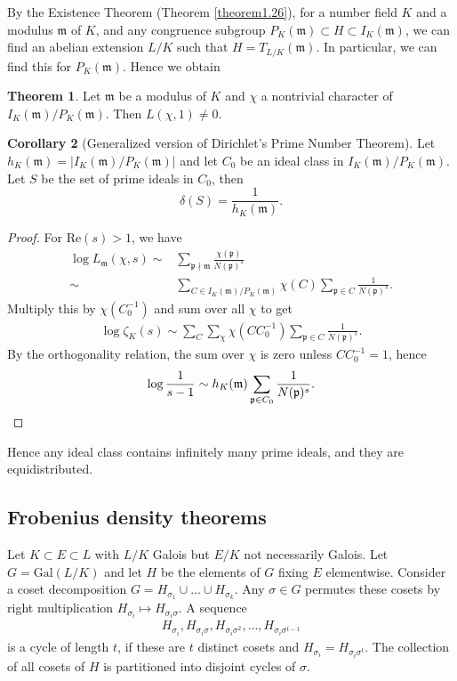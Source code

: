 \documentclass{article}
\theoremstyle{definition}
\newtheorem{theorem}{Theorem}[section]
\newtheorem{cor}[theorem]{Corollary}
\begin{document}
By the Existence Theorem (Theorem \ref{theorem1.26}), for a number field $K$ and a modulus $\mathfrak{m}$ of $K$, and any congruence subgroup $P_K(\mathfrak{m}) \subset H \subset I_K(\mathfrak{m})$, we can find an abelian extension $L/K$ such that $H = T_{L/K}(\mathfrak{m})$. In particular, we can find this for $P_K(\mathfrak{m})$. Hence we obtain
\begin{theorem}\label{theorem3.6}
    Let $\mathfrak{m}$ be a modulus of $K$ and $\chi$ a nontrivial character of $I_K(\mathfrak{m})/P_K(\mathfrak{m})$. Then $L(\chi,1) \neq 0$.
\end{theorem}
\begin{cor}[Generalized version of Dirichlet's Prime Number Theorem]\label{cor3.7}
    Let $h_K(\mathfrak{m}) = \left|I_K(\mathfrak{m})/P_K(\mathfrak{m})\right|$ and let $C_0$ be an ideal class in $I_K(\mathfrak{m})/P_K(\mathfrak{m})$. Let $S$ be the set of prime ideals in $C_0$, then \[
    \delta(S) = \frac{1}{h_K(\mathfrak{m})}.
    \]
\end{cor}
\begin{proof}
    For $\text{Re}(s)>1$, we have
    \begin{align*}
        \log L_{\mathfrak{m}}(\chi,s) \sim& \sum_{\mathfrak{p} \nmid \mathfrak{m}}^{} \frac{\chi(\mathfrak{p})}{N(\mathfrak{p})^s} \\
        \sim& \sum_{C \in I_K(\mathfrak{m})/P_K(\mathfrak{m})}^{} \chi(C) \sum_{\mathfrak{p}\in C}^{} \frac{1}{N(\mathfrak{p})^s}.
    \end{align*}
    Multiply this by $\chi(C_0^{-1})$ and sum over all $\chi$ to get
    \begin{align*}
        \log \zeta_K(s) \sim \sum_{C}^{} \sum_{\chi}^{} \chi(C C_0^{-1}) \sum_{\mathfrak{p} \in C}^{} \frac{1}{N(\mathfrak{p})^s}.
    \end{align*}
    By the orthogonality relation, the sum over $\chi$ is zero unless $C C_0^{-1} = 1$, hence 
    \begin{align*}
        \log \frac{1}{s-1} \sim h_K(\mathfrak{m}) \sum_{\mathfrak{p} \in C_0}^{} \frac{1}{N(\mathfrak{p})^s}.
        \qedhere
    \end{align*}
\end{proof}
Hence any ideal class contains infinitely many prime ideals, and they are equidistributed.

\subsection{Frobenius density theorems}
Let $K \subset E \subset L$ with $L/K$ Galois but $E/K$ not necessarily Galois. Let $G = \text{Gal}(L/K)$ and let $H$ be the elements of $G$ fixing $E$ elementwise. Consider a coset decomposition $G = H_{\sigma_1} \cup \ldots \cup H_{\sigma_k}$. Any $\sigma \in G$ permutes these cosets by right multiplication $H_{\sigma_i} \mapsto H_{\sigma_i \sigma}$. A sequence 
\begin{align*}
    H_{\sigma_i}, H_{\sigma_i \sigma}, H_{\sigma_i \sigma^2}, \ldots, H_{\sigma_i \sigma^{t-1}}
\end{align*}
is a cycle of length $t$, if these are $t$ distinct cosets and $H_{\sigma_i} = H_{\sigma_i \sigma^t}$. The collection of all cosets of $H$ is partitioned into disjoint cycles of $\sigma$.
\end{document}
